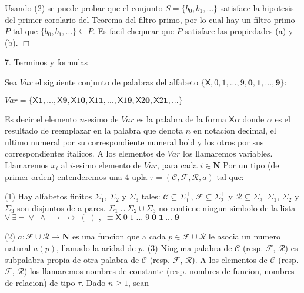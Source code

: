 Usando (2) se puede probar que el conjunto \(S=\{b_{0},b_{1},...\}\) satisface la hipotesis del primer corolario del Teorema del filtro primo, por lo cual hay un filtro primo \(P\) tal que \(\{b_{0},b_{1},...\}\subseteq P\). Es facil chequear que \(P\) satisface las propiedades (a) y (b). \(\Box\)

7. Terminos y formulas

Sea \(Var\) el siguiente conjunto de palabras del alfabeto \(\{\mathsf{X}, \mathit{0},\mathit{1},...,\mathit{9},\mathbf{0},\mathbf{1},...,\mathbf{9}\}\):

\(\displaystyle Var=\{\mathsf{X}\mathbf{1},...,\mathsf{X}\mathbf{9},\mathsf{X}\mathit{1} \mathbf{0},\mathsf{X}\mathit{1}\mathbf{1},...,\mathsf{X}\mathit{1}\mathbf{9}, \mathsf{X}\mathit{2}\mathbf{0},\mathsf{X}\mathit{2}\mathbf{1},...\} \)

Es decir el elemento \(n\)-esimo de \(Var\) es la palabra de la forma \(\mathsf{X} \alpha \) donde \(\alpha \) es el resultado de reemplazar en la palabra que denota \(n\) en notacion decimal, el ultimo numeral por su correspondiente numeral bold y los otros por sus correspondientes italicos. A los elementos de \(Var\) los llamaremos variables. Llamaremos \(x_{i}\) al \(i\)-esimo elemento de \(Var\), para cada \(i\in \mathbf{N}\)
Por un tipo (de primer orden) entenderemos una 4-upla \( \tau =(\mathcal{C},\mathcal{F},\mathcal{R},a)\) tal que:

(1) Hay alfabetos finitos \(\Sigma _{1}\), \(\Sigma _{2}\) y \(\Sigma _{3}\) tales:
\(\mathcal{C}\subseteq \Sigma _{1}^{+}\), \(\mathcal{F}\subseteq \Sigma _{2}^{+}\) y \(\mathcal{R}\subseteq \Sigma _{3}^{+}\)
\(\Sigma _{1}\), \(\Sigma _{2}\) y \(\Sigma _{3}\) son disjuntos de a pares.
\(\Sigma _{1}\cup \Sigma _{2}\cup \Sigma _{3}\) no contiene ningun simbolo de la lista
\(\forall \ \exists \;\lnot \;\vee \;\wedge \;\rightarrow \;\leftrightarrow \;(\;)\;,\;\equiv \mathsf{X\;}\mathit{0}\;\mathit{1\;}...\;\mathit{9}\; \mathbf{0}\;\mathbf{1}\ ...\;\mathbf{9}\)

(2) \(a:\mathcal{F}\cup \mathcal{R}\rightarrow \mathbf{N}\) es una funcion que a cada \(p\in \mathcal{F}\cup \mathcal{R}\) le asocia un numero natural \(a(p)\), llamado la aridad de \(p\).
(3) Ninguna palabra de \(\mathcal{C}\) (resp. \(\mathcal{F}\), \(\mathcal{R }\)) es subpalabra propia de otra palabra de \(\mathcal{C}\) (resp. \(\mathcal{F} \), \(\mathcal{R}\)).
A los elementos de \(\mathcal{C}\) (resp. \(\mathcal{F}\), \(\mathcal{R} \)) los llamaremos nombres de constante (resp. nombres de funcion, nombres de relacion) de tipo \(\tau \). Dado \(n\geq 1\), sean

